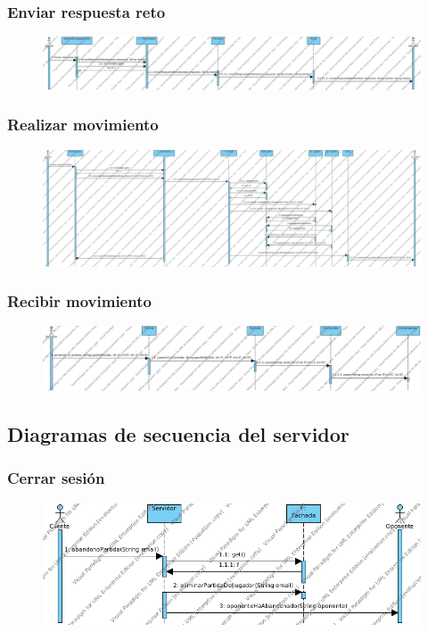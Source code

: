 \subsubsection{Enviar respuesta reto}
 \begin{figure}[h]
 \centering
 \includegraphics[scale=0.3]{img/ds_EnviarRespuestaRetoCliente.png}
 \end{figure}
 \clearpage
\subsubsection{Realizar movimiento}
 \begin{figure}[h]
 \centering
 \includegraphics[scale=0.25]{img/ds_RealizarMovimientoCliente.png}
 \end{figure}
\subsubsection{Recibir movimiento}
 \begin{figure}[h]
 \centering
 \includegraphics[scale=0.35]{img/ds_RecibirMovimientoCliente.png}
 \end{figure}
 \clearpage
\subsection{Diagramas de secuencia del servidor}
\subsubsection{Cerrar sesión}
 \begin{figure}[h]
 \centering
 \includegraphics[scale=0.7]{img/ds_CerrarSesionServidor.png}
 \end{figure}
